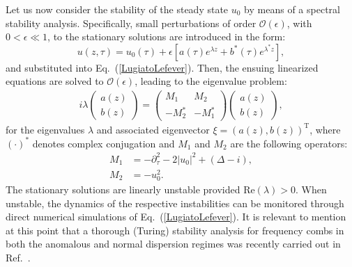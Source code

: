 Let us now consider the stability of the steady state $u_0$ by means 
of a spectral stability analysis.
Specifically, small perturbations of order $\mathcal{O}(\epsilon)$, 
with $0<\epsilon \ll 1$, to the stationary solutions are introduced in the 
form:
%
\begin{equation}
u(z, \tau) =  u_0(\tau) + \epsilon [ a(\tau)e^{\lambda z} + b^*(\tau)e^{\lambda^* z}],
\nonumber
\end{equation}
%
and substituted into Eq.~(\ref{LugiatoLefever}).  Then, the ensuing linearized equations are solved to $\mathcal{O} (\epsilon)$, leading to the eigenvalue problem:
%
\begin{align}
i \lambda \begin{pmatrix} a(z) \\ b(z) \end{pmatrix} = \begin{pmatrix} M_1 & M_2 \\  -M_2^* & -M_1^* \end{pmatrix} \begin{pmatrix} a(z) \\ b(z) \end{pmatrix}, 
\label{PDEEigenProblem}
\end{align}
%
for the eigenvalues $\lambda$ and associated eigenvector $\xi = (a(z),b(z))^\mathrm{T}$,
where $(\cdot)^*$ denotes complex conjugation and $M_1$ and $M_2$ are the following
operators:
%
\begin{align}
M_1 &=  - \partial_\tau^2 - 2|u_0|^2+(\Delta - i), \nonumber \\
M_2 &= -u_0^2.
\end{align}
%
The stationary solutions are linearly unstable provided Re$(\lambda)> 0$.
When unstable, the dynamics of the respective instabilities can be monitored 
through direct numerical simulations of Eq.~(\ref{LugiatoLefever}).
%
It is relevant to mention at this point that a thorough (Turing) stability analysis 
for frequency combs in both the anomalous and normal dispersion regimes
was recently carried out in Ref.~\cite{LLE_french_PRA}.

